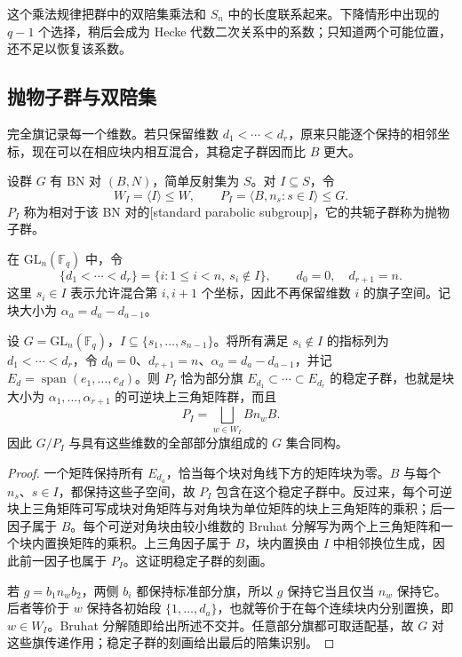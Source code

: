 这个乘法规律把群中的双陪集乘法和 \(S_n\) 中的长度联系起来。下降情形中出现的 \(q-1\) 个选择，稍后会成为 Hecke 代数二次关系中的系数；只知道两个可能位置，还不足以恢复该系数。

\subsection{抛物子群与双陪集}
\label{b5:subsec:F02:03}

完全旗记录每一个维数。若只保留维数 \(d_1<\cdots<d_r\)，原来只能逐个保持的相邻坐标，现在可以在相应块内相互混合，其稳定子群因而比 \(B\) 更大。

\begin{definition}\label{b5:def:F-standard-parabolic}
	设群 \(G\) 有 BN 对 \((B,N)\)，简单反射集为 \(S\)。对 \(I\subseteq S\)，令
	\[
		W_I=\langle I\rangle\le W,\qquad
		P_I=\langle B,n_s:s\in I\rangle\le G.
	\]
	\(P_I\) 称为相对于该 BN 对的[standard parabolic subgroup]，它的共轭子群称为抛物子群。
\end{definition}

在 \(\mathrm{GL}_n(\mathbb F_q)\) 中，令
\[
	\{d_1<\cdots<d_r\}=\{i:1\le i<n,\ s_i\notin I\},
	\qquad d_0=0,\quad d_{r+1}=n.
\]
这里 \(s_i\in I\) 表示允许混合第 \(i,i+1\) 个坐标，因此不再保留维数 \(i\) 的旗子空间。记块大小为 \(\alpha_a=d_a-d_{a-1}\)。

\begin{proposition}\label{b5:prop:F-parabolic-flags}
	设 \(G=\mathrm{GL}_n(\mathbb F_q)\)，\(I\subseteq\{s_1,\ldots,s_{n-1}\}\)。将所有满足 \(s_i\notin I\) 的指标列为 \(d_1<\cdots<d_r\)，令 \(d_0=0\)、\(d_{r+1}=n\)、\(\alpha_a=d_a-d_{a-1}\)，并记 \(E_d=\operatorname{span}(e_1,\ldots,e_d)\)。则 \(P_I\) 恰为部分旗 \(E_{d_1}\subset\cdots\subset E_{d_r}\) 的稳定子群，也就是块大小为 \(\alpha_1,\ldots,\alpha_{r+1}\) 的可逆块上三角矩阵群，而且
	\[
		P_I=\bigsqcup_{w\in W_I}Bn_wB.
	\]
	因此 \(G/P_I\) 与具有这些维数的全部部分旗组成的 \(G\) 集合同构。
\end{proposition}
\begin{proof}
	一个矩阵保持所有 \(E_{d_a}\)，恰当每个块对角线下方的矩阵块为零。\(B\) 与每个 \(n_s\)、\(s\in I\)，都保持这些子空间，故 \(P_I\) 包含在这个稳定子群中。反过来，每个可逆块上三角矩阵可写成块对角矩阵与对角块为单位矩阵的块上三角矩阵的乘积；后一因子属于 \(B\)。每个可逆对角块由较小维数的 Bruhat 分解写为两个上三角矩阵和一个块内置换矩阵的乘积。上三角因子属于 \(B\)，块内置换由 \(I\) 中相邻换位生成，因此前一因子也属于 \(P_I\)。这证明稳定子群的刻画。

	若 \(g=b_1n_wb_2\)，两侧 \(b_i\) 都保持标准部分旗，所以 \(g\) 保持它当且仅当 \(n_w\) 保持它。后者等价于 \(w\) 保持各初始段 \(\{1,\ldots,d_a\}\)，也就等价于在每个连续块内分别置换，即 \(w\in W_I\)。Bruhat 分解随即给出所述不交并。任意部分旗都可取适配基，故 \(G\) 对这些旗传递作用；稳定子群的刻画给出最后的陪集识别。
\end{proof}

